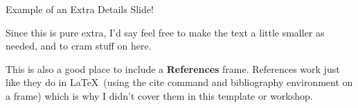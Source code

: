 \documentclass{beamer}
\begin{document}
\begin{frame}{Example of an Extra Details Slide!}		%

	Since this is pure extra, I'd say feel free to make the text a little smaller as needed, and to cram stuff on here.
	
	\bigskip
	
	This is also a good place to include a \textbf{References} frame. References work just like they do in \LaTeX\ (using the \alert{cite} command and \alert{bibliography} environment on a frame) which is why I didn't cover them in this template or workshop. 

\end{frame}
\end{document}
